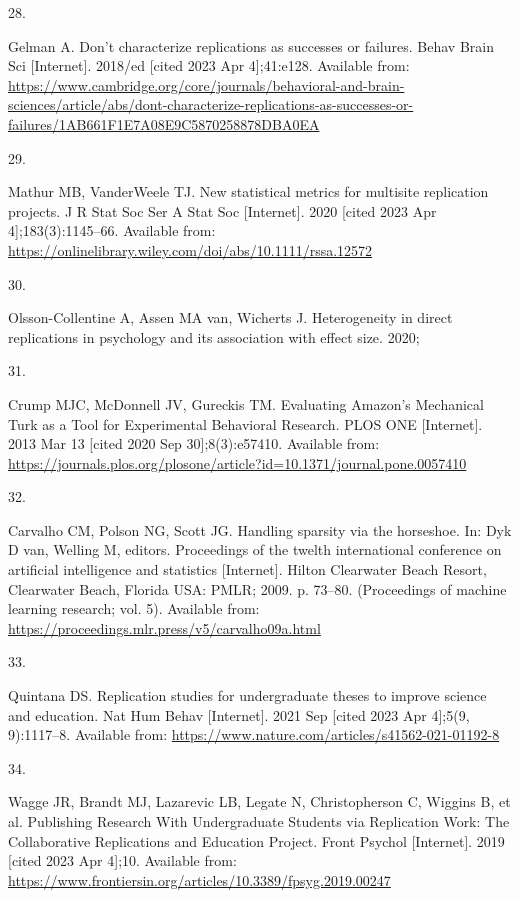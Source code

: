 \documentclass[
  english,
  a4paper,
]{article}
\newlength{\cslhangindent}
\newlength{\csllabelwidth}
\newlength{\cslentryspacingunit} %
\newenvironment{CSLReferences}[2] %
 {%
  \setlength{\parindent}{0pt}
  \ifodd #1
  \let\oldpar\par
  \def\par{\hangindent=\cslhangindent\oldpar}
  \fi
  \setlength{\parskip}{#2\cslentryspacingunit}
 }%
 {}
\newcommand{\CSLLeftMargin}[1]{\parbox[t]{\csllabelwidth}{#1}}
\newcommand{\CSLRightInline}[1]{\parbox[t]{\linewidth - \csllabelwidth}{#1}\break}
\begin{document}
\begin{CSLReferences}{0}{0}
\leavevmode{}%
\CSLLeftMargin{28. }%
\CSLRightInline{Gelman A. Don't characterize replications as successes or failures. Behav Brain Sci {[}Internet{]}. 2018/ed {[}cited 2023 Apr 4{]};41:e128. Available from: \url{https://www.cambridge.org/core/journals/behavioral-and-brain-sciences/article/abs/dont-characterize-replications-as-successes-or-failures/1AB661F1E7A08E9C5870258878DBA0EA}}

\leavevmode{}%
\CSLLeftMargin{29. }%
\CSLRightInline{Mathur MB, VanderWeele TJ. New statistical metrics for multisite replication projects. J R Stat Soc Ser A Stat Soc {[}Internet{]}. 2020 {[}cited 2023 Apr 4{]};183(3):1145--66. Available from: \url{https://onlinelibrary.wiley.com/doi/abs/10.1111/rssa.12572}}

\leavevmode{}%
\CSLLeftMargin{30. }%
\CSLRightInline{Olsson-Collentine A, Assen MA van, Wicherts J. Heterogeneity in direct replications in psychology and its association with effect size. 2020; }

\leavevmode{}%
\CSLLeftMargin{31. }%
\CSLRightInline{Crump MJC, McDonnell JV, Gureckis TM. Evaluating {Amazon}'s {Mechanical Turk} as a {Tool} for {Experimental Behavioral Research}. PLOS ONE {[}Internet{]}. 2013 Mar 13 {[}cited 2020 Sep 30{]};8(3):e57410. Available from: \url{https://journals.plos.org/plosone/article?id=10.1371/journal.pone.0057410}}

\leavevmode{}%
\CSLLeftMargin{32. }%
\CSLRightInline{Carvalho CM, Polson NG, Scott JG. Handling sparsity via the horseshoe. In: Dyk D van, Welling M, editors. Proceedings of the twelth international conference on artificial intelligence and statistics {[}Internet{]}. Hilton Clearwater Beach Resort, Clearwater Beach, Florida USA: PMLR; 2009. p. 73--80. (Proceedings of machine learning research; vol. 5). Available from: \url{https://proceedings.mlr.press/v5/carvalho09a.html}}

\leavevmode{}%
\CSLLeftMargin{33. }%
\CSLRightInline{Quintana DS. Replication studies for undergraduate theses to improve science and education. Nat Hum Behav {[}Internet{]}. 2021 Sep {[}cited 2023 Apr 4{]};5(9, 9):1117--8. Available from: \url{https://www.nature.com/articles/s41562-021-01192-8}}

\leavevmode{}%
\CSLLeftMargin{34. }%
\CSLRightInline{Wagge JR, Brandt MJ, Lazarevic LB, Legate N, Christopherson C, Wiggins B, et al. Publishing {Research With Undergraduate Students} via {Replication Work}: {The Collaborative Replications} and {Education Project}. Front Psychol {[}Internet{]}. 2019 {[}cited 2023 Apr 4{]};10. Available from: \url{https://www.frontiersin.org/articles/10.3389/fpsyg.2019.00247}}


\end{CSLReferences}
\end{document}
